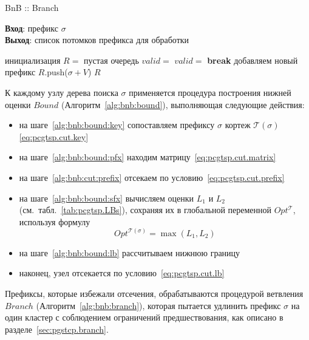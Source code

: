 \begin{algorithm}
  \caption{BnB :: Branch}\label{alg:bnb:branch}
  \textbf{Вход}: префикс $\sigma$ \\
  \textbf{Выход}: список потомков префикса для обработки
  \begin{algorithmic}[1]
      \STATE инициализация $R =$ пустая очередь
          \STATE $valid =$ \TRUE
                  \STATE $valid =$ \FALSE
                  \STATE \textbf{break}
              \ENDIF
          \ENDFOR
              \STATE добавляем новый префикс $R$.push($\sigma+V$)
          \ENDIF
      \ENDFOR
      \RETURN $R$
  \end{algorithmic}
\end{algorithm}

К каждому узлу дерева поиска
$\sigma$
применяется процедура построения нижней оценки $Bound$
(Алгоритм~\ref{alg:bnb:bound}),
выполняющая следующие действия:
\begin{itemize}
  \item
  на шаге~\ref{alg:bnb:bound:key}
  сопоставляем префиксу $\sigma$
  кортеж $\mathcal T(\sigma) $
  \eqref{eq:pcgtsp.cut.key}
  \item
  на шаге~\ref{alg:bnb:bound:pfx}
  находим матрицу~\eqref{eq:pcgtsp.cut.matrix}
  \item
  на шаге~\ref{alg:bnb:cut:prefix}
  отсекаем по условию~\eqref{eq:pcgtsp.cut.prefix}
  \item
  на шаге~\ref{alg:bnb:bound:sfx}
  вычисляем оценки $L_1$ и $L_2$
  (см.~табл.~\ref{tab:pcgtsp.LBs}),
  сохраняя их в глобальной переменной
  $Opt^{\mathcal T}$,
  используя формулу
  $$
  Opt^{\mathcal T(\sigma)} = \max(L_1, L_2)
  $$
  \item
  на шаге~\ref{alg:bnb:bound:lb}
  рассчитываем нижнюю границу
  \item
  наконец, узел отсекается по условию~\eqref{eq:pcgtsp.cut.lb}
\end{itemize}

Префиксы,
которые избежали отсечения,
обрабатываются процедурой ветвления $Branch$
(Алгоритм~\ref{alg:bnb:branch}),
которая пытается удлинить префикс
$\sigma$
на один кластер с соблюдением ограничений предшествования,
как описано в разделе~\ref{sec:pgstcp.branch}.
